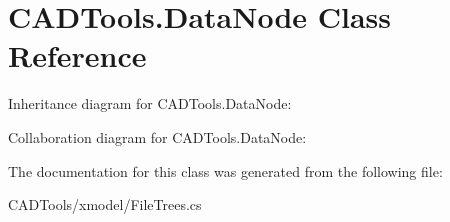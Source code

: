 \hypertarget{class_c_a_d_tools_1_1_data_node}{}\section{C\+A\+D\+Tools.\+Data\+Node Class Reference}
\label{class_c_a_d_tools_1_1_data_node}


Inheritance diagram for C\+A\+D\+Tools.\+Data\+Node\+:


Collaboration diagram for C\+A\+D\+Tools.\+Data\+Node\+:


The documentation for this class was generated from the following file\+:\begin{DoxyCompactItemize}
\item 
C\+A\+D\+Tools/xmodel/File\+Trees.\+cs\end{DoxyCompactItemize}
